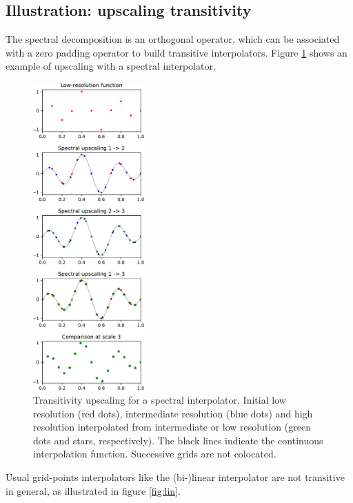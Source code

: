 \documentclass[12pt]{scrartcl}
\begin{document}
\subsection{Illustration: upscaling transitivity}
The spectral decomposition is an orthogonal operator, which can be associated with a zero padding operator to build transitive interpolators. Figure \ref{fig:sp} shows an example of upscaling with a spectral interpolator.

\begin{figure}[!h]
\begin{center}
\includegraphics[width=0.38\textwidth]{interpolation_comparison_sp.pdf}
\end{center}
\caption{\label{fig:sp} Transitivity upscaling for a spectral interpolator. Initial low resolution (red dots), intermediate resolution (blue dots) and high resolution interpolated from intermediate or low resolution (green dots and stars, respectively). The black lines indicate the continuous interpolation function. Successive grids are not colocated.}
\end{figure}

Usual grid-points interpolators like the (bi-)linear interpolator are not transitive in general, as illustrated in figure \ref{fig:lin}.
\end{document}
